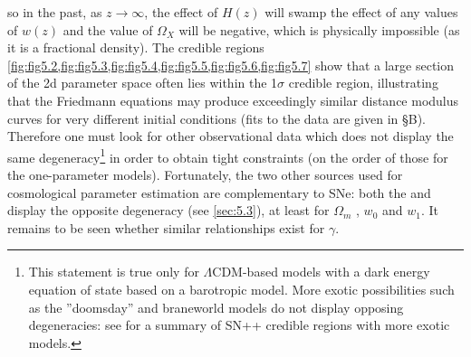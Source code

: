 so in the past, as $z \rightarrow{} \infty{}$, the effect of $H(z)$ will swamp the effect of any values of $w(z)$ and the value of $\Omega_X$ will be negative,\cite{vanOsten2006} which is physically impossible (as it is a fractional density). The credible regions \cref{fig:fig5.2,fig:fig5.3,fig:fig5.4,fig:fig5.5,fig:fig5.6,fig:fig5.7} show that a large section of the 2d parameter space often lies within the 1$\sigma$ credible region, illustrating that the Friedmann equations may produce exceedingly similar distance modulus curves for very different initial conditions (fits to the data are given in §B). Therefore one must look for other observational data which does not display the same degeneracy\footnote{This statement is true only for $\Lambda$CDM-based models with a dark energy equation of state based on a barotropic model. More exotic possibilities such as the ”doomsday” and braneworld models do not display opposing degeneracies: see \cite{Rubin2008} for a summary of SN+\cmb{}+\bao{} credible regions with more exotic models.} in order to obtain tight constraints (on the order of those for the one-parameter models). 
Fortunately, the two other sources used for cosmological parameter estimation are complementary to SNe: both the \cmb{} and \bao{} display the opposite degeneracy (see \cref{sec:5.3}), at least for $\Omega_m$ , $w_0$ and $w_1$. It remains to be seen whether similar relationships exist for $\gamma$.





